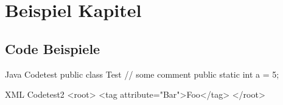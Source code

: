 \chapter{Beispiel Kapitel}

\lipsum
\cite{internet}

\section{Code Beispiele}

\begin{java}{Java Code}{test}
public class Test {
	// some comment
	public static int a = 5;
}
\end{java}

\begin{xml}{XML Code}{test2}
<root>
	<tag attribute="Bar">Foo</tag>
</root>
\end{xml}

